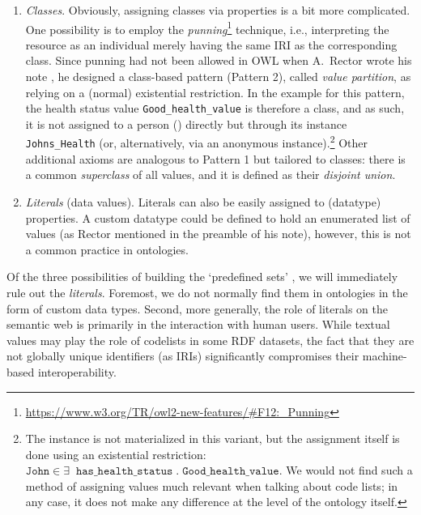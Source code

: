 \begin{enumerate}
    \item \emph{Classes}.
    Obviously, assigning classes via properties is a bit more complicated. 
    One possibility is to employ the \emph{punning}\footnote{\url{https://www.w3.org/TR/owl2-new-features/\#F12:\_Punning}} technique, i.e., interpreting the resource as an  individual merely having the same IRI as the corresponding class. 
    Since punning had not been allowed in OWL when A.~Rector wrote his note \cite{alanrector}, he designed a class-based pattern (Pattern 2), called \emph{value partition}, as relying on a (normal) existential restriction. In the example for this pattern, the health status value \texttt{Good\_health\_value} is therefore a class, and as such, it is not assigned to a person () directly but through its instance \texttt{Johns\_Health} (or, alternatively, via an anonymous instance).\footnote{The instance is not materialized in this variant, but the assignment itself is done using an existential restriction: $\texttt{John} \in \exists \; \; \texttt{has\_health\_status} \; . \; \texttt{Good\_health\_value}$. We would not find such a method of assigning values much relevant when talking about code lists; in any case, it does not make any difference at the level of the ontology itself.}
    Other additional axioms are analogous to Pattern 1 but tailored to classes: there is a common \emph{superclass} of all values, and it is defined as their \emph{disjoint union}.
    
    \item \emph{Literals} (data values).
    Literals can also be easily assigned to (datatype) properties.
    A custom datatype could be defined to hold an enumerated list of values (as Rector mentioned in the preamble of his note), however, this is not a common practice in ontologies.
\end{enumerate}

Of the three possibilities of building the `predefined sets' \cite{guide_code_list}, we will immediately rule out the \emph{literals}.
Foremost, we do not normally find them in ontologies in the form of custom data types.
Second, more generally, the role of literals on the semantic web is primarily in the interaction with human users. 
While textual values may play the role of codelists in some RDF datasets, the fact that they are not globally unique identifiers (as IRIs) significantly compromises their machine-based interoperability.

